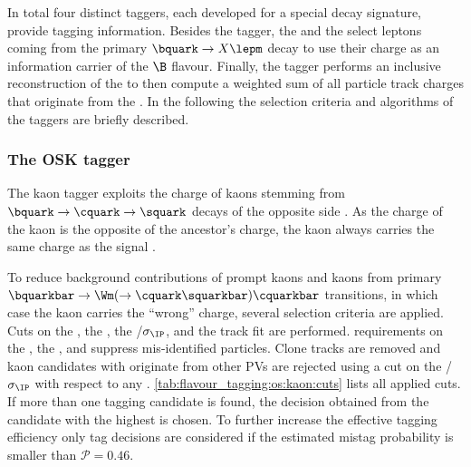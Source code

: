 In total four distinct \OS taggers, each developed for a special \OS decay
signature, provide tagging information. Besides the \OSK tagger, the \OSe and
the \OSm select leptons coming from the primary $\bquark \to X \lepm$ decay to
use their charge as an information carrier of the $\B$ flavour. Finally, the
\OSvtx tagger performs an inclusive reconstruction of the \OS \SV to then
compute a weighted sum of all particle track charges that originate from the
\SV. In the following the selection criteria and algorithms of the \OS taggers
are briefly described.

 
\subsubsection{The \acl{OSK} tagger}
\label{sec:flavour_tagging:os:kaon}
The kaon tagger exploits the charge of kaons stemming from $\bquark \to
\cquark \to \squark$ decays of the opposite side \bhadron. As the charge of the
kaon is the opposite of the ancestor's charge, the kaon always carries the same
charge as the signal \Bmeson.

To reduce background contributions of prompt kaons and kaons from primary
$\bquarkbar \to \Wm (\to \cquark \squarkbar) \cquarkbar$ transitions, in which
case the kaon carries the \enquote{wrong} charge, several selection criteria are
applied. Cuts on the \pT, the \IP, the \IP/$\sigma_\text{\IP}$, and the track
fit \chisqndf are performed. \PID requirements on the \DLLKpi, the \DLLppi, and
\DLLmupi suppress mis-identified particles. Clone tracks are removed and kaon
candidates with originate from other \acp{PV} are rejected using a cut on the
\IP/$\sigma_\text{\IP}$ with respect to any \PV.
\cref{tab:flavour_tagging:os:kaon:cuts} lists all applied cuts. If more than one
tagging candidate is found, the decision obtained from the candidate with the
highest \pT is chosen. To further increase the effective tagging efficiency only
tag decisions are considered if the estimated mistag probability is smaller than
$\mathcal{P}=0.46$.

